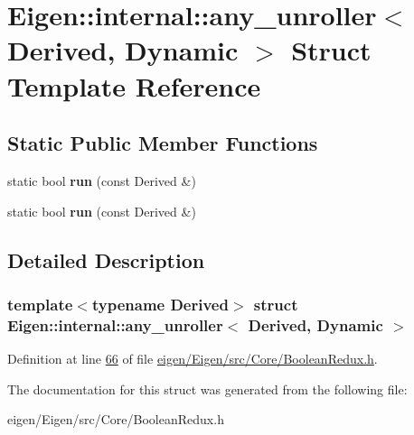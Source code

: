 \hypertarget{struct_eigen_1_1internal_1_1any__unroller_3_01_derived_00_01_dynamic_01_4}{}\section{Eigen\+:\+:internal\+:\+:any\+\_\+unroller$<$ Derived, Dynamic $>$ Struct Template Reference}
\label{struct_eigen_1_1internal_1_1any__unroller_3_01_derived_00_01_dynamic_01_4}
\subsection*{Static Public Member Functions}
\begin{DoxyCompactItemize}
\item 
\mbox{\label{struct_eigen_1_1internal_1_1any__unroller_3_01_derived_00_01_dynamic_01_4_a45692835ecbe96b0f30b59d2d20d61b5}} 
static bool {\bfseries run} (const Derived \&)
\item 
\mbox{\label{struct_eigen_1_1internal_1_1any__unroller_3_01_derived_00_01_dynamic_01_4_a45692835ecbe96b0f30b59d2d20d61b5}} 
static bool {\bfseries run} (const Derived \&)
\end{DoxyCompactItemize}


\subsection{Detailed Description}
\subsubsection*{template$<$typename Derived$>$\newline
struct Eigen\+::internal\+::any\+\_\+unroller$<$ Derived, Dynamic $>$}



Definition at line \hyperlink{eigen_2_eigen_2src_2_core_2_boolean_redux_8h_source_l00066}{66} of file \hyperlink{eigen_2_eigen_2src_2_core_2_boolean_redux_8h_source}{eigen/\+Eigen/src/\+Core/\+Boolean\+Redux.\+h}.



The documentation for this struct was generated from the following file\+:\begin{DoxyCompactItemize}
\item 
eigen/\+Eigen/src/\+Core/\+Boolean\+Redux.\+h\end{DoxyCompactItemize}
